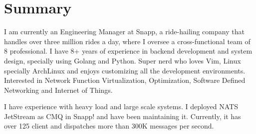 \section{Summary}\closesection{}

I am currently an Engineering Manager at Snapp, a ride-hailing company that handles over three million rides a day,
where I oversee a cross-functional team of 8 professional.
I have 8+ years of experience in backend development and system design,
specially using Golang and Python.
Super nerd who loves Vim, Linux specially ArchLinux and enjoys customizing all the development environments.
Interested in Network Function Virtualization, Optimization, Software Defined Networking and Internet of Things.

I have experience with heavy load and large scale systems. I deployed NATS JetStream as CMQ in Snapp! and
have been maintaining it. Currently, it has over 125 client and dispatches more than 300K messages per second.
